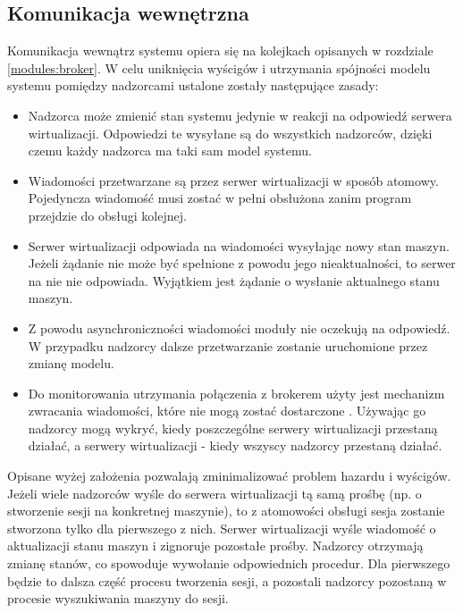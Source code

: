 \documentclass[../opis-rozwiazania.tex]{subfiles}
\begin{document}
\label{communication}

\subsection{Komunikacja wewnętrzna}
\label{communication:broker}

Komunikacja wewnątrz systemu opiera się na kolejkach opisanych w rozdziale \ref{modules:broker}. W celu uniknięcia wyścigów i utrzymania spójności modelu systemu pomiędzy nadzorcami ustalone zostały następujące zasady:
\begin{itemize}
  \item Nadzorca może zmienić stan systemu jedynie w reakcji na odpowiedź serwera wirtualizacji. Odpowiedzi te wysyłane są do wszystkich nadzorców, dzięki czemu każdy nadzorca ma taki sam model systemu.
  \item Wiadomości przetwarzane są przez serwer wirtualizacji w sposób atomowy. Pojedyncza wiadomość musi zostać w pełni obsłużona zanim program przejdzie do obsługi kolejnej.
  \item Serwer wirtualizacji odpowiada na wiadomości wysyłając nowy stan maszyn. Jeżeli żądanie nie może być spełnione z powodu jego nieaktualności, to serwer na nie nie odpowiada. Wyjątkiem jest żądanie o wysłanie aktualnego stanu maszyn.
  \item Z powodu asynchroniczności wiadomości moduły nie oczekują na odpowiedź. W przypadku nadzorcy dalsze przetwarzanie zostanie uruchomione przez zmianę modelu.
  \item Do monitorowania utrzymania połączenia z brokerem użyty jest mechanizm zwracania wiadomości, które nie mogą zostać dostarczone \parencite{rabbit-unroutable}. Używając go nadzorcy mogą wykryć, kiedy poszczególne serwery wirtualizacji przestaną działać, a serwery wirtualizacji - kiedy wszyscy nadzorcy przestaną działać.
\end{itemize}

Opisane wyżej założenia pozwalają zminimalizować problem hazardu i wyścigów. Jeżeli wiele nadzorców wyśle do serwera wirtualizacji tą samą prośbę (np. o stworzenie sesji na konkretnej maszynie), to z atomowości obsługi sesja zostanie stworzona tylko dla pierwszego z nich. Serwer wirtualizacji wyśle wiadomość o aktualizacji stanu maszyn i zignoruje pozostałe prośby. Nadzorcy otrzymają zmianę stanów, co spowoduje wywołanie odpowiednich procedur. Dla pierwszego będzie to dalsza część procesu tworzenia sesji, a pozostali nadzorcy pozostaną w procesie wyszukiwania maszyny do sesji.
\end{document}
